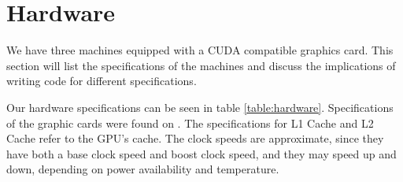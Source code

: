\section{Hardware}\label{sect:hardware}

We have three machines equipped with a CUDA compatible graphics card. This section will list the specifications of the machines and discuss the implications of writing code for different specifications.

Our hardware specifications can be seen in table \ref{table:hardware}. Specifications of the graphic cards were found on \cite{techpowerup:gpu_specs}. The specifications for L1 Cache and L2 Cache refer to the GPU's cache. The clock speeds are approximate, since they have both a base clock speed and boost clock speed, and they may speed up and down, depending on power availability and temperature.

